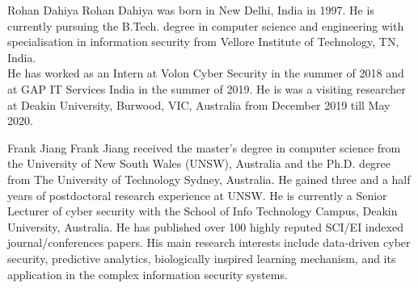 \documentclass[journal]{IEEEtran}
\begin{document}
%

% 
\newpage

\begin{IEEEbiography}{Rohan Dahiya}
Rohan Dahiya was born in New Delhi, India in 1997. He is currently pursuing the B.Tech. degree in computer science and engineering with specialisation in information security from Vellore Institute of Technology, TN, India. \\ He has worked as an Intern at Volon Cyber Security in the summer of 2018 and at GAP IT Services India in the summer of 2019. He is was a visiting researcher at Deakin University, Burwood, VIC, Australia from December 2019 till May 2020.
\end{IEEEbiography}

\begin{IEEEbiography}{Frank Jiang}
Frank Jiang received the master’s degree in computer science from the University of New South Wales (UNSW), Australia and the Ph.D. degree from The University of Technology Sydney, Australia. He gained three and a half years of postdoctoral research experience at UNSW. He is currently a Senior Lecturer of cyber security with the School of Info Technology Campus, Deakin University, Australia. He has published over 100 highly reputed SCI/EI indexed journal/conferences papers. His main research interests include data-driven cyber security, predictive analytics, biologically inspired learning mechanism, and its application in the complex information security systems.
\end{IEEEbiography}
\end{document}
